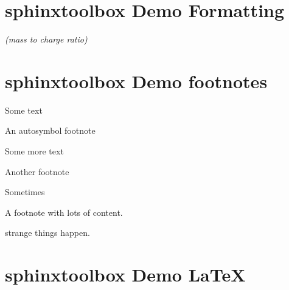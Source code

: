 \documentclass[letterpaper,10pt,english]{sphinxmanual}
\newcommand\thesymbolfootnote{\fnsymbol{footnote}}\let\thenumberfootnote\thefootnote
\begin{document}
\chapter{sphinx\sphinxhyphen{}toolbox Demo \sphinxhyphen{} Formatting}
\label{\detokenize{formatting:sphinx-toolbox-demo-formatting}}\label{\detokenize{formatting::doc}}
\textit{ (mass to charge ratio)}

\textit{}

\vspace{10px}

\vspace{10px}


\chapter{sphinx\sphinxhyphen{}toolbox Demo \sphinxhyphen{} footnotes}
\label{\detokenize{footnote_symbols:sphinx-toolbox-demo-footnotes}}\label{\detokenize{footnote_symbols::doc}}
Some text %
\renewcommand\thefootnote{\thesymbolfootnote}\begin{footnote}[2]\sphinxAtStartFootnote
An auto\sphinxhyphen{}symbol footnote
%
\end{footnote}\renewcommand\thefootnote{\thenumberfootnote}

Some more text %
\renewcommand\thefootnote{\thesymbolfootnote}\begin{footnote}[3]\sphinxAtStartFootnote
Another footnote
%
\end{footnote}\renewcommand\thefootnote{\thenumberfootnote}

Sometimes %
\renewcommand\thefootnote{\thesymbolfootnote}\begin{footnote}[4]\sphinxAtStartFootnote
A footnote with lots of content.

\sphinxSetupCodeBlockInFootnote
\begin{sphinxVerbatim}[commandchars=\\\{\}]
\end{sphinxVerbatim}
%
\end{footnote}\renewcommand\thefootnote{\thenumberfootnote} strange things happen.


\chapter{sphinx\sphinxhyphen{}toolbox Demo \sphinxhyphen{} LaTeX}
\label{\detokenize{latex:sphinx-toolbox-demo-latex}}\label{\detokenize{latex::doc}}
\clearpage
\end{document}
